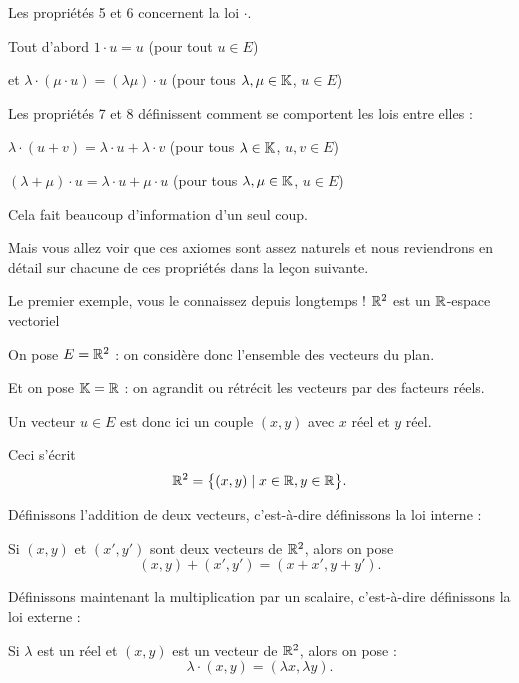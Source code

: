 Les propriétés 5 et 6 concernent la loi $\cdot$.

Tout d'abord $1 \cdot u = u$ \quad (pour tout $u \in E$)

\change

et $\lambda \cdot (\mu \cdot u) = (\lambda\mu )\cdot u$ \quad (pour tous $\lambda, \mu \in \mathbb{K}$, $u \in E$)

\change

Les propriétés 7 et 8 définissent comment se comportent les lois entre elles :

$\lambda \cdot (u+v) = \lambda \cdot u + \lambda \cdot v$ \quad (pour tous $\lambda \in \mathbb{K}$, $u,v \in E$)

\change

$(\lambda + \mu ) \cdot u = \lambda \cdot u + \mu \cdot u$ \quad (pour tous $\lambda,\mu \in \mathbb{K}$, $u \in E$)

Cela fait beaucoup d'information d'un seul coup.

Mais vous allez voir que ces axiomes sont assez naturels
et nous reviendrons en détail sur chacune de ces propriétés dans la leçon suivante.

\diapo

Le premier exemple, vous le connaissez depuis longtemps !
$\mathbb{R}^2$ est un $\mathbb{R}$-espace vectoriel

On pose $E=\mathbb{R}^2$ : on considère donc l'ensemble des vecteurs du plan.

Et on pose $\mathbb{K}=\mathbb{R}$ : on agrandit ou rétrécit les vecteurs par des facteurs réels.

\change


  Un vecteur $u\in E$ est donc ici un
  couple $(x,y)$ avec $x$ réel et $y$ réel. 
  
\change
  
  Ceci s'écrit 
  $$\mathbb{R}^2=\big\{(x,y)\mid x \in \mathbb{R}, y \in \mathbb{R}\big\}.$$
 
\change

Définissons l'addition de deux vecteurs, c'est-à-dire définissons la loi interne :

    Si $(x,y)$ et $(x',y')$ sont deux vecteurs de $\mathbb{R}^2$, alors on pose
  $$(x,y)+(x',y')=(x+x',y+y').$$

\change

Définissons maintenant la multiplication par un scalaire, c'est-à-dire définissons la loi externe :

    Si $\lambda$ est un réel et $(x,y)$ est un vecteur de $\mathbb{R}^2$, alors on pose :
  $$\lambda \cdot (x,y)=(\lambda x, \lambda y).$$

